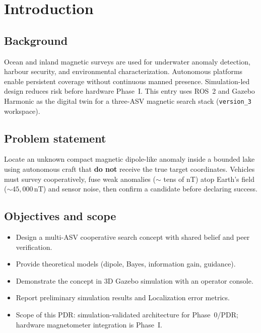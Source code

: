 \documentclass[11pt,a4paper]{article}
\begin{document}
\section{Introduction}
\subsection{Background}
Ocean and inland magnetic surveys are used for underwater anomaly detection,
harbour security, and environmental characterization. Autonomous platforms
enable persistent coverage without continuous manned presence. Simulation-led
design reduces risk before hardware Phase~I. This entry uses ROS~2 and Gazebo
Harmonic as the digital twin for a three-ASV magnetic search stack
(\texttt{version\_3} workspace).

\subsection{Problem statement}
Locate an unknown compact magnetic dipole-like anomaly inside a bounded lake
using autonomous craft that \textbf{do not} receive the true target coordinates.
Vehicles must survey cooperatively, fuse weak anomalies ($\sim$ tens of nT) atop
Earth's field ($\sim45{,}000\,\mathrm{nT}$) and sensor noise, then confirm a
candidate before declaring success.

\subsection{Objectives and scope}
\begin{itemize}[leftmargin=*,itemsep=1pt]
  \item Design a multi-ASV cooperative search concept with shared belief and
        peer verification.
  \item Provide theoretical models (dipole, Bayes, information gain, guidance).
  \item Demonstrate the concept in 3D Gazebo simulation with an operator console.
  \item Report preliminary simulation results and Localization error metrics.
  \item Scope of this PDR: simulation-validated architecture for Phase~0/PDR;
        hardware magnetometer integration is Phase~I.
\end{itemize}
\end{document}

